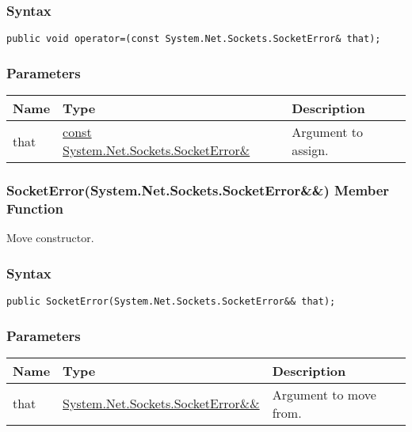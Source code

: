 \documentclass[a4paper,oneside,11.000000pt]{book}
\begin{document}
\subsubsection*{Syntax}
\texttt{public void operator=(const System.Net.Sockets.SocketError\& that);}
\subsubsection*{Parameters}
\begin{flushleft}
\begin{supertabular}[l]{!{\raggedright}p{1.30721cm}!{\raggedright}p{8.55945cm}!{\raggedright}p{4.89046cm}}
\textbf{Name}
& \textbf{Type}
& \textbf{Description}
\\
\hline
that
& \hyperlink{System.Net.Sockets.SocketError}{const System.\-Net.\-Sockets.\-SocketError\&\-}
& Argument to assign.

\\
\end{supertabular}

\end{flushleft}
\clearpage

\hypertarget{System.Net.Sockets.SocketError.constructor.P.System.Net.Sockets.SocketError.RR.System.Net.Sockets.SocketError}{\subsubsection*{SocketError(System.Net.Sockets.SocketError\&\&) Member Function}}\begin{flushleft}
Move constructor.

\end{flushleft}
\subsubsection*{Syntax}
\texttt{public SocketError(System.Net.Sockets.SocketError\&\& that);}
\subsubsection*{Parameters}
\begin{flushleft}
\begin{supertabular}[l]{!{\raggedright}p{1.30721cm}!{\raggedright}p{8.55945cm}!{\raggedright}p{4.93333cm}}
\textbf{Name}
& \textbf{Type}
& \textbf{Description}
\\
\hline
that
& \hyperlink{System.Net.Sockets.SocketError}{System.\-Net.\-Sockets.\-SocketError\&\-\&\-}
& Argument to move from.

\\
\end{supertabular}

\end{flushleft}
\clearpage
\end{document}

